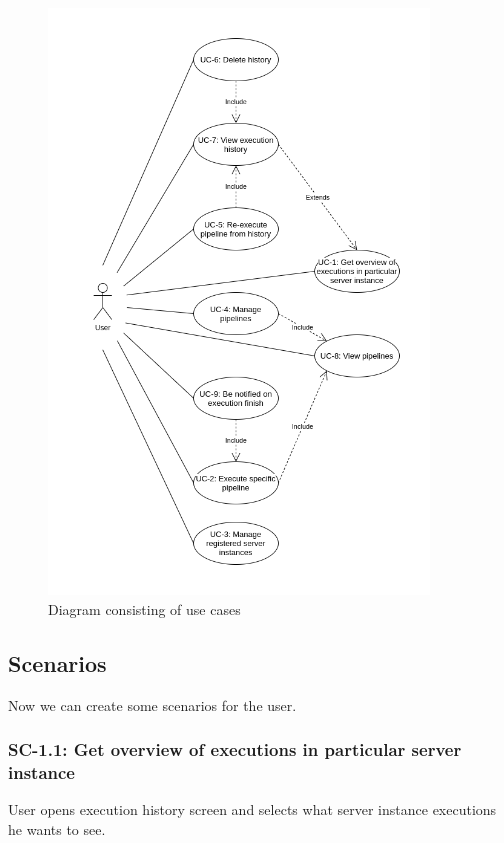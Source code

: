 \begin{figure}\centering
	\includegraphics[width=0.9\textwidth]{pics/bc-uc.png}
	\caption[Use cases]{Diagram consisting of use cases}\label{fig:uc}
\end{figure}


\subsection{Scenarios}
Now we can create some scenarios for the user.

\subsubsection*{SC-1.1: Get overview of executions in particular server instance}
User opens execution history screen and selects what server instance executions he wants to see.
